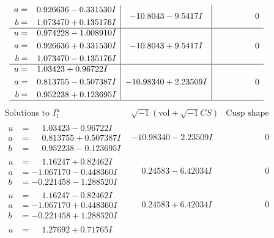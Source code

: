 \documentclass[1p]{elsarticle_modified}
\theoremstyle{definition}
\newcommand{\I}{\sqrt{-1}}
\begin{document}
$$\begin{array}{c|c|c}
\begin{aligned}
a &= \phantom{-}0.926636 - 0.331530 I \\
b &= \phantom{-}1.073470 + 0.135176 I\end{aligned}
 & -10.8043 - 9.5417 I & \phantom{-0.000000 } 0 \\ \hline\begin{aligned}
u &= \phantom{-}0.974228 - 1.008910 I \\
a &= \phantom{-}0.926636 + 0.331530 I \\
b &= \phantom{-}1.073470 - 0.135176 I\end{aligned}
 & -10.8043 + 9.5417 I & \phantom{-0.000000 } 0 \\ \hline\begin{aligned}
u &= \phantom{-}1.03423 + 0.96722 I \\
a &= \phantom{-}0.813755 - 0.507387 I \\
b &= \phantom{-}0.952238 + 0.123695 I\end{aligned}
 & -10.98340 + 2.23509 I & \phantom{-0.000000 } 0\\
 \hline 
 \end{array}$$\newpage$$\begin{array}{c|c|c}  
\text{Solutions to }I^u_{1}& \I (\text{vol} + \sqrt{-1}CS) & \text{Cusp shape}\\
 \hline 
\begin{aligned}
u &= \phantom{-}1.03423 - 0.96722 I \\
a &= \phantom{-}0.813755 + 0.507387 I \\
b &= \phantom{-}0.952238 - 0.123695 I\end{aligned}
 & -10.98340 - 2.23509 I & \phantom{-0.000000 } 0 \\ \hline\begin{aligned}
u &= \phantom{-}1.16247 + 0.82462 I \\
a &= -1.067170 - 0.448360 I \\
b &= -0.221458 - 1.288520 I\end{aligned}
 & \phantom{-}0.24583 - 6.42034 I & \phantom{-0.000000 } 0 \\ \hline\begin{aligned}
u &= \phantom{-}1.16247 - 0.82462 I \\
a &= -1.067170 + 0.448360 I \\
b &= -0.221458 + 1.288520 I\end{aligned}
 & \phantom{-}0.24583 + 6.42034 I & \phantom{-0.000000 } 0 \\ \hline\begin{aligned}
u &= \phantom{-}1.27692 + 0.71765 I \\

\end{aligned}
\end{array}$$
\end{document}
